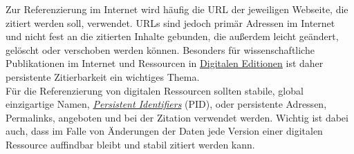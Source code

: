 \documentclass{article}
\begin{document}
    Zur Referenzierung im Internet wird häufig die URL der jeweiligen Webseite, die zitiert werden soll, verwendet. URLs sind jedoch primär Adressen im Internet und nicht fest an die zitierten Inhalte gebunden, die außerdem leicht geändert, gelöscht oder verschoben werden können. Besonders für wissenschaftliche Publikationen im Internet und Ressourcen in \href{http://gams.uni-graz.at/o:konde.59}{Digitalen Editionen} ist daher persistente Zitierbarkeit ein wichtiges Thema.\\
            
        Für die Referenzierung von digitalen Ressourcen sollten stabile, global einzigartige Namen, \emph{\href{http://gams.uni-graz.at/o:konde.12}{Persistent Identifiers}} (PID), oder persistente Adressen, Permalinks, angeboten und bei der Zitation verwendet werden. Wichtig ist dabei auch, dass im Falle von Änderungen der Daten jede Version einer digitalen Ressource auffindbar bleibt und stabil zitiert werden kann. \\
            
\end{document}
